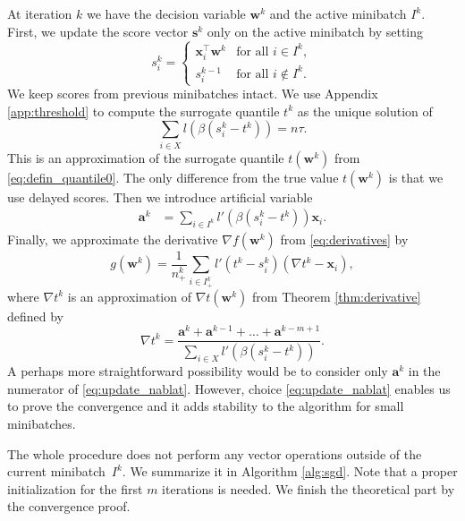 \documentclass{Thesis}
\begin{document}
At iteration $k$ we have the decision variable $\bm{w}^k$ and the active minibatch $I^k$. First, we update the score vector $\bm{s}^k$ only on the active minibatch by setting
\begin{equation}\label{eq:defin_z}
  s_i^k = \begin{cases} \bm{x}_i^\top \bm{w}^k &\text{for all }i\in I^k,\\ s_i^{k-1} &\text{for all }i\notin I^k.\end{cases} 
\end{equation}
We keep scores from previous minibatches intact. We use Appendix \ref{app:threshold} to compute the surrogate quantile $t^k$ as the unique solution of
\begin{equation}\label{eq:update_t}
  \sum_{i \in X}l(\beta(s_i^k - t^k)) = n\tau.
\end{equation}
This is an approximation of the surrogate quantile $t(\bm{w}^k)$ from \eqref{eq:defin_quantile0}. The only difference from the true value $t(\bm{w}^k)$ is that we use delayed scores. Then we introduce artificial variable
\begin{equation}\label{eq:update_a}
  \begin{aligned}
    \bm{a}^k &= \sum_{i\in I^k}l'(\beta(s_i^k - t^k))\bm{x}_i.
  \end{aligned}
\end{equation}
Finally, we approximate the derivative $\nabla f(\bm{w}^k)$ from \eqref{eq:derivatives} by
\begin{equation}\label{eq:update_g}
  g(\bm{w}^k) = \frac{1}{n^k_+}\sum_{i\in I^k_+}l'(t^k - s_i^k)(\nabla t^k - \bm{x}_i),
\end{equation}
where $\nabla t^k$ is an approximation of $\nabla t(\bm{w}^k)$ from Theorem \ref{thm:derivative} defined by
\begin{equation}\label{eq:update_nablat}
  \nabla t^k = \frac{\bm{a}^k + \bm{a}^{k-1} + \dots + \bm{a}^{k - m + 1}}{\sum_{i \in X} l'(\beta(s_i^k - t^k))}.
\end{equation}
A perhaps more straightforward possibility would be to consider only $\bm{a}^k$ in the numerator of \eqref{eq:update_nablat}. However, choice \eqref{eq:update_nablat} enables us to prove the convergence and it adds stability to the algorithm for small minibatches.

The whole procedure does not perform any vector operations outside of the current minibatch~$I^k$. We summarize it in Algorithm \ref{alg:sgd}. Note that a proper initialization for the first $m$ iterations is needed. We finish the theoretical part by the convergence proof.
\end{document}
